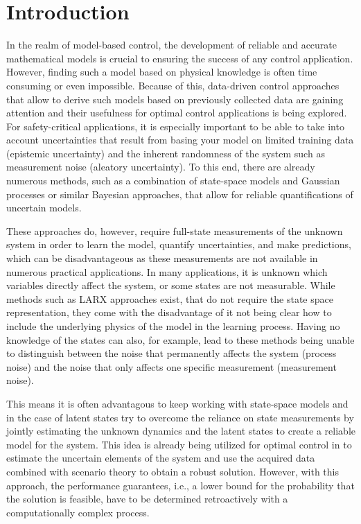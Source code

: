\chapter{Introduction}
\label{sec:introduction}

In the realm of model-based control, the development of reliable and accurate mathematical models is crucial to ensuring the success of any control application. However, finding such a model based on physical knowledge is often time consuming or even impossible. Because of this, data-driven control approaches that allow to derive such models based on previously collected data are gaining attention and their usefulness for optimal control applications is being explored. For safety-critical applications, it is especially important to be able to take into account uncertainties that result from basing your model on limited training data (epistemic uncertainty) and the inherent randomness of the system such as measurement noise (aleatory uncertainty). To this end, there are already numerous methods, such as a combination of state-space models and Gaussian processes \cite{Williams_06} or similar Bayesian approaches, that allow for reliable quantifications of uncertain models.

These approaches do, however, require full-state measurements of the unknown system in order to learn the model, quantify uncertainties, and make predictions, which can be disadvantageous as these measurements are not available in numerous practical applications. In many applications, it is unknown which variables directly affect the system, or some states are not measurable. While methods such as LARX approaches \cite{Maiworm_21} exist, that do not require the state space representation, they come with the disadvantage of it not being clear how to include the underlying physics of the model in the learning process. Having no knowledge of the states can also, for example, lead to these methods being unable to distinguish between the noise that permanently affects the system (process noise) and the noise that only affects one specific measurement (measurement noise). 

This means it is often advantagous to keep working with state-space models and in the case of latent states try to overcome the reliance on state measurements by jointly estimating the unknown dynamics and the latent states to create a reliable model for the system. This idea is already being utilized for optimal control in \cite{Robert_24} to estimate the uncertain elements of the system and use the acquired data combined with scenario theory \cite{Garatti_22} to obtain a robust solution. However, with this approach, the performance guarantees, i.e., a lower bound for the probability that the solution is feasible, have to be determined retroactively with a computationally complex process.
 
